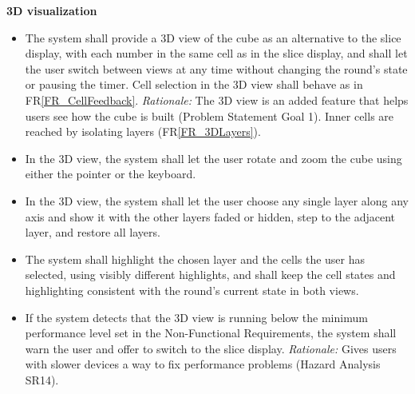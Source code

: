 \documentclass[12pt]{article}
\newcounter{reqnum} %
\newcommand{\rref}[1]{FR\ref{#1}}
\begin{document}
\noindent \textbf{3D visualization}
\begin{itemize}
 
\item[FR\refstepcounter{reqnum}\thereqnum \label{FR_3DView}:] The system shall provide a 3D view of the cube as an alternative to the slice display, with each number in the same cell as in the slice display, and shall let the user switch between views at any time without changing the round's state or pausing the timer. Cell selection in the 3D view shall behave as in \rref{FR_CellFeedback}. \newline \textit{Rationale:} The 3D view is an added feature that helps users see how the cube is built (Problem Statement Goal 1). Inner cells are reached by isolating layers (\rref{FR_3DLayers}).
 
\item[FR\refstepcounter{reqnum}\thereqnum \label{FR_3DNavigate}:] In the 3D view, the system shall let the user rotate and zoom the cube using either the pointer or the keyboard.
 
\item[FR\refstepcounter{reqnum}\thereqnum \label{FR_3DLayers}:] In the 3D view, the system shall let the user choose any single layer along any axis and show it with the other layers faded or hidden, step to the adjacent layer, and restore all layers.
 
\item[FR\refstepcounter{reqnum}\thereqnum \label{FR_3DHighlight}:] The system shall highlight the chosen layer and the cells the user has selected, using visibly different highlights, and shall keep the cell states and highlighting consistent with the round's current state in both views.
 
\item[FR\refstepcounter{reqnum}\thereqnum \label{FR_PerformanceWarning}:] If the system detects that the 3D view is running below the minimum performance level set in the Non-Functional Requirements, the system shall warn the user and offer to switch to the slice display. \newline \textit{Rationale:} Gives users with slower devices a way to fix performance problems (Hazard Analysis SR14).

\end{itemize}
 
\end{document}
